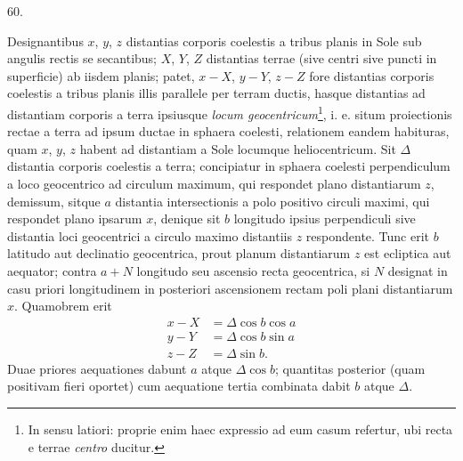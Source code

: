 \par\medskip
\hypertarget{native-079-article060}{}
\begin{center}60.\end{center}
Designantibus $x$, $y$, $z$ distantias corporis coelestis a tribus planis in Sole sub angulis rectis se secantibus; $X$, $Y$, $Z$ distantias terrae (sive centri sive puncti in superficie) ab iisdem planis; patet, $x-X$, $y-Y$, $z-Z$ fore distantias corporis coelestis a tribus planis illis parallele per terram ductis, hasque distantias ad distantiam corporis a terra ipsiusque \textit{locum geocentricum}\footnote{In sensu latiori: proprie enim haec expressio ad eum casum refertur, ubi recta e terrae \textit{centro} ducitur.}, i. e. situm proiectionis rectae a terra ad ipsum ductae in sphaera coelesti, relationem eandem habituras, quam $x$, $y$, $z$ habent ad distantiam a Sole locumque heliocentricum. Sit $\Delta$ distantia corporis coelestis a terra; concipiatur in sphaera coelesti perpendiculum a loco geocentrico ad circulum maximum, qui respondet plano distantiarum $z$, demissum, sitque $a$ distantia intersectionis a polo positivo circuli maximi, qui respondet plano ipsarum $x$, denique sit $b$ longitudo ipsius perpendiculi sive distantia loci geocentrici a circulo maximo distantiis $z$ respondente. Tunc erit $b$ latitudo aut declinatio geocentrica, prout planum distantiarum $z$ est ecliptica aut aequator; contra $a+N$ longitudo seu ascensio recta geocentrica, si $N$ designat in casu priori longitudinem in posteriori ascensionem rectam poli plani distantiarum $x$. Quamobrem erit
\[
\begin{aligned}
x-X&=\Delta\cos b\cos a\\
y-Y&=\Delta\cos b\sin a\\
z-Z&=\Delta\sin b.
\end{aligned}
\]
Duae priores aequationes dabunt $a$ atque $\Delta\cos b$; quantitas posterior (quam positivam fieri oportet) cum aequatione tertia combinata dabit $b$ atque $\Delta$.
